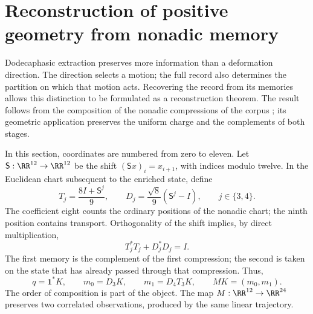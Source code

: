 \section{Reconstruction of positive geometry from nonadic memory}
\label{sec:memory}

Dodecaphasic extraction preserves more information than a deformation
direction. The direction selects a motion; the full record
also determines the partition on which that motion acts. Recovering
the record from its memories allows this distinction to be
formulated as a reconstruction theorem. The result follows from the
composition of the nonadic compressions of the corpus \cite{hmtX}; its geometric
application preserves the uniform charge and the complements of both stages.

In this section, coordinates are numbered from zero to eleven. Let
\(\mathsf S:\RR^{12}\to\RR^{12}\) be the shift
\((\mathsf Sx)_i=x_{i+1}\), with indices modulo twelve. In the Euclidean chart
subsequent to the enriched state, define
\[
 T_j=\frac{8I+\mathsf S^j}{9},\qquad
 D_j=\frac{\sqrt8}{9}(\mathsf S^j-I),\qquad j\in\{3,4\}.
\]
The coefficient eight counts the ordinary positions of the nonadic chart;
the ninth position contains transport. Orthogonality of the shift
implies, by direct multiplication,
\[
 T_j^*T_j+D_j^*D_j=I.
\]
The first memory is the complement of the first compression; the second
is taken on the state that has already passed through that compression. Thus,
\begin{equation}
 q=\mathbf1^*K,\qquad m_0=D_3K,\qquad m_1=D_4T_3K,
 \qquad MK=(m_0,m_1).
 \label{eq:mem-data}
\end{equation}
The order of composition is part of the object. The map
\(M:\RR^{12}\to\RR^{24}\) preserves two correlated observations,
produced by the same linear trajectory.

